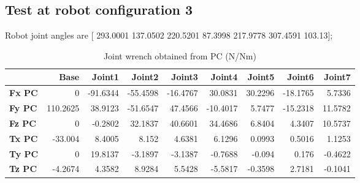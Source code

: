 
\subsection{Test at robot configuration 3}
Robot joint angles are  [ 293.0001      137.0502      220.5201       87.3998      217.9778      307.4591        103.13];

\begin{table}[h!]
	\centering
	\caption{Joint wrench obtained from PC (N/Nm)}
	\label{wrech_PC_Pose3}
	\begin{tabular}{|l|r|r|r|r|r|r|r|r|}
		\hline
		\textbf{}  & \textbf{Base} & \textbf{Joint1}  & \textbf{Joint2}  & \textbf{Joint3}  & \textbf{Joint4}  & \textbf{Joint5}  & \textbf{Joint6}  & \textbf{Joint7} \\ \hline
		\textbf{Fx PC}  & 0        & -91.6344        & -55.4598        & -16.4767        & 30.0831        & 30.2296        & -18.1765        & 5.7336 \\ \hline
		\textbf{Fy PC}  & 110.2625        & 38.9123        & -51.6547        & 47.4566        & -10.4017        & 5.7477        & -15.2318        & 11.5782 \\ \hline
		\textbf{Fz PC}  & 0        & -0.2802        & 32.1837        & 40.6601        & 34.4686        & 6.8404        & 4.3407        & 10.5737 \\ \hline
		\textbf{Tx PC}  & -33.004        & 8.4005        & 8.152        & 4.6381        & 6.1296        & 0.0993        & 0.5016        & 1.1253 \\ \hline
		\textbf{Ty PC}  & 0        & 19.8137        & -3.1897        & -3.1387        & -0.7688        & -0.094        & 0.176        & -0.4622 \\ \hline
		\textbf{Tz PC}  & -4.2674        & 4.3582        & 8.9284        & 5.5428        & -5.5817        & -0.3598        & 2.7181        & -0.1041 \\ \hline
	\end{tabular}
\end{table}

